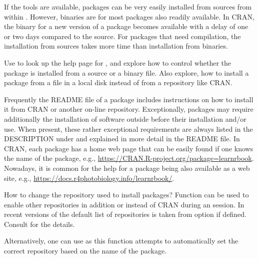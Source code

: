 \documentclass[krantz2]{krantz}\usepackage{knitr}
\begin{document}
If the tools are available, packages can be very easily installed from sources from within \RStudio. However, binaries are for most packages also readily available. In CRAN, the binary for a new version of a package becomes available with a delay of one or two days compared to the source. For packages that need compilation, the installation from sources takes more time than installation from binaries.

\begin{advplayground}
Use  to look up the help page for , and explore how to control whether the package is installed from a source or a binary file. Also explore, how to install a package from a file in a local disk instead of from a repository like CRAN.
\end{advplayground}

Frequently the README file of a package includes instructions on how to install it from CRAN or another on-line repository. Exceptionally, packages may require additionally the installation of software outside \Rpgrm before their installation and/or use. When present, these rather exceptional requirements are always listed in the DESCRIPTION under  and explained in more detail in the README file. In CRAN, each package has a home web page that can be easily found if one knows the name of the package, e.g., \url{https://CRAN.R-project.org/package=learnrbook}. Nowadays, it is common for the help for a package being also available as a web site, e.g., \url{https://docs.r4photobiology.info/learnrbook/}.

\begin{faqbox}{How to change the repository used to install packages?}
Function  can be used to enable other repositories in addition or instead of CRAN during an \Rpgrm session. In recent versions of \Rpgrm the default list of repositories is taken from \Rlang option  if defined. Consult  for the details.

Alternatively, one can use  as this function attempts to automatically set the correct repository based on the name of the package.
\end{faqbox}
\end{document}
